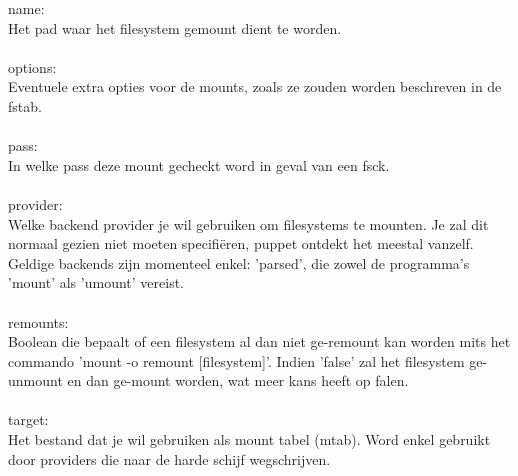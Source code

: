 %
name:\\
Het pad waar het filesystem gemount dient te worden.\\\\
%
options:\\
Eventuele extra opties voor de mounts, zoals ze zouden worden beschreven in de fstab.\\\\
%
pass:\\
In welke pass deze mount gecheckt word in geval van een fsck.\\\\
%
provider:\\
Welke backend provider je wil gebruiken om filesystems te mounten. Je zal dit normaal gezien niet moeten specifi\"eren, puppet ontdekt het meestal vanzelf. Geldige backends zijn momenteel enkel: 'parsed', die zowel de programma's 'mount' als 'umount' vereist.\\\\
%
remounts:\\
Boolean die bepaalt of een filesystem al dan niet ge-remount kan worden mits het commando 'mount -o remount [filesystem]'. Indien 'false' zal het filesystem ge-unmount en dan ge-mount worden, wat meer kans heeft op falen.\\\\
%
target:\\
Het bestand dat je wil gebruiken als mount tabel (mtab). Word enkel gebruikt door providers die naar de harde schijf wegschrijven.\\\\
